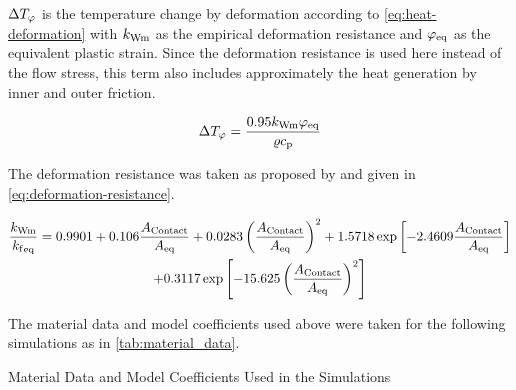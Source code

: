 \noindent$\Delta{T}_{{\varphi}}$ is the temperature change by deformation according to \autoref{eq:heat-deformation} with ${k_\mathrm{Wm}}$ as the empirical deformation resistance and ${{{\varphi}}_\mathrm{eq}}$ as the equivalent plastic strain.
Since the deformation resistance is used here instead of the flow stress, this term also includes approximately the heat generation by inner and outer friction.

\begin{equation}
    \Delta{T}_{{\varphi}} = \frac{\num{0.95} {k_\mathrm{Wm}} {{{\varphi}}_\mathrm{eq}}}{{\varrho}{c_\mathrm{p}}}
    \label{eq:heat-deformation}
\end{equation}

The deformation resistance was taken as proposed by \textcite{Hensel1978} and given in \autoref{eq:deformation-resistance}.

\begin{multline}
    \frac{{k_\mathrm{Wm}}}{{{{k_\mathrm{f}}}_\mathrm{eq}}} = \num{0.9901} + \num{0.106} \frac{{{A}_\mathrm{Contact}}}{{{{A}}_\mathrm{eq}}} + \num{0.0283} \left( \frac{{{A}_\mathrm{Contact}}}{{{{A}}_\mathrm{eq}}} \right)^2 + \num{1.5718} \exp \left[ \num{-2.4609} \frac{{{A}_\mathrm{Contact}}}{{{{A}}_\mathrm{eq}}} \right] \\
    + \num{0.3117} \exp \left[ \num{-15.625} \left( \frac{{{A}_\mathrm{Contact}}}{{{{A}}_\mathrm{eq}}} \right)^2 \right]
    \label{eq:deformation-resistance}
\end{multline}

The material data and model coefficients used above were taken for the following simulations as in \autoref{tab:material_data}.

\begin{table}
    \centering
    \caption{Material Data and Model Coefficients Used in the Simulations}
    \label{tab:material_data}
    
\end{table}

